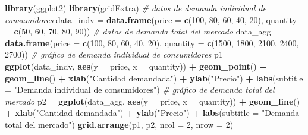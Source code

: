 \documentclass[
  spanish,
  12pt,
]{book}
\newenvironment{Shaded}{\begin{snugshade}}{\end{snugshade}}
\newcommand{\AttributeTok}[1]{\textcolor[rgb]{0.13,0.29,0.53}{#1}}
\newcommand{\CommentTok}[1]{\textcolor[rgb]{0.56,0.35,0.01}{\textit{#1}}}
\newcommand{\DecValTok}[1]{\textcolor[rgb]{0.00,0.00,0.81}{#1}}
\newcommand{\FunctionTok}[1]{\textcolor[rgb]{0.13,0.29,0.53}{\textbf{#1}}}
\newcommand{\NormalTok}[1]{#1}
\newcommand{\OtherTok}[1]{\textcolor[rgb]{0.56,0.35,0.01}{#1}}
\newcommand{\SpecialCharTok}[1]{\textcolor[rgb]{0.81,0.36,0.00}{\textbf{#1}}}
\newcommand{\StringTok}[1]{\textcolor[rgb]{0.31,0.60,0.02}{#1}}
\begin{document}
\begin{Shaded}
\begin{Highlighting}[]
\FunctionTok{library}\NormalTok{(ggplot2)}
\FunctionTok{library}\NormalTok{(gridExtra)}
\CommentTok{\# datos de demanda individual de consumidores}
\NormalTok{data\_indv }\OtherTok{=} \FunctionTok{data.frame}\NormalTok{(}\AttributeTok{price =} \FunctionTok{c}\NormalTok{(}\DecValTok{100}\NormalTok{, }\DecValTok{80}\NormalTok{, }\DecValTok{60}\NormalTok{, }\DecValTok{40}\NormalTok{, }\DecValTok{20}\NormalTok{), }
                        \AttributeTok{quantity =} \FunctionTok{c}\NormalTok{(}\DecValTok{50}\NormalTok{, }\DecValTok{60}\NormalTok{, }\DecValTok{70}\NormalTok{, }\DecValTok{80}\NormalTok{, }\DecValTok{90}\NormalTok{))}
\CommentTok{\# datos de demanda total del mercado}
\NormalTok{data\_agg }\OtherTok{=} \FunctionTok{data.frame}\NormalTok{(}\AttributeTok{price =} \FunctionTok{c}\NormalTok{(}\DecValTok{100}\NormalTok{, }\DecValTok{80}\NormalTok{, }\DecValTok{60}\NormalTok{, }\DecValTok{40}\NormalTok{, }\DecValTok{20}\NormalTok{), }
                      \AttributeTok{quantity =} \FunctionTok{c}\NormalTok{(}\DecValTok{1500}\NormalTok{, }\DecValTok{1800}\NormalTok{, }\DecValTok{2100}\NormalTok{, }\DecValTok{2400}\NormalTok{, }\DecValTok{2700}\NormalTok{))}
\CommentTok{\# gráfico de demanda individual de consumidores}
\NormalTok{p1 }\OtherTok{=} \FunctionTok{ggplot}\NormalTok{(data\_indv, }\FunctionTok{aes}\NormalTok{(}\AttributeTok{y =}\NormalTok{ price, }\AttributeTok{x =}\NormalTok{ quantity)) }\SpecialCharTok{+} 
  \FunctionTok{geom\_point}\NormalTok{() }\SpecialCharTok{+}
  \FunctionTok{geom\_line}\NormalTok{() }\SpecialCharTok{+}
  \FunctionTok{xlab}\NormalTok{(}\StringTok{"Cantidad demandada"}\NormalTok{) }\SpecialCharTok{+}
  \FunctionTok{ylab}\NormalTok{(}\StringTok{"Precio"}\NormalTok{) }\SpecialCharTok{+}
  \FunctionTok{labs}\NormalTok{(}\AttributeTok{subtitle =} \StringTok{"Demanda individual de consumidores"}\NormalTok{)}
\CommentTok{\# gráfico de demanda total del mercado}
\NormalTok{p2 }\OtherTok{=} \FunctionTok{ggplot}\NormalTok{(data\_agg, }\FunctionTok{aes}\NormalTok{(}\AttributeTok{y =}\NormalTok{ price, }\AttributeTok{x =}\NormalTok{ quantity)) }\SpecialCharTok{+} 
  \FunctionTok{geom\_line}\NormalTok{() }\SpecialCharTok{+}
  \FunctionTok{xlab}\NormalTok{(}\StringTok{"Cantidad demandada"}\NormalTok{) }\SpecialCharTok{+}
  \FunctionTok{ylab}\NormalTok{(}\StringTok{"Precio"}\NormalTok{) }\SpecialCharTok{+}
  \FunctionTok{labs}\NormalTok{(}\AttributeTok{subtitle =} \StringTok{"Demanda total del mercado"}\NormalTok{)}
\FunctionTok{grid.arrange}\NormalTok{(p1, p2, }\AttributeTok{ncol =} \DecValTok{2}\NormalTok{, }\AttributeTok{nrow =} \DecValTok{2}\NormalTok{)}
\end{Highlighting}
\end{Shaded}
\end{document}
